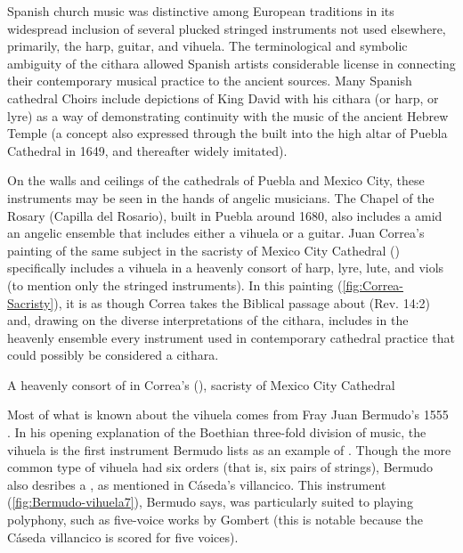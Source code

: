 Spanish church music was distinctive among European traditions in its
widespread inclusion of several plucked stringed instruments not used
elsewhere, primarily, the harp, guitar, and vihuela. 
The terminological and symbolic ambiguity of the cithara allowed Spanish
artists considerable license in connecting their contemporary musical practice
to the ancient sources.
Many Spanish cathedral Choirs include depictions of King David with his cithara
(or harp, or lyre) as a way of demonstrating continuity with the music of the
ancient Hebrew Temple (a concept also expressed through the  built into the high altar of Puebla Cathedral in 1649, and thereafter
widely imitated). 

On the walls and ceilings of the cathedrals of Puebla and Mexico City, these
instruments may be seen in the hands of angelic musicians.
The Chapel of the Rosary (Capilla del Rosario), built in Puebla around 1680,
also includes a  amid an angelic ensemble
that includes either a vihuela or a guitar.
Juan Correa's painting of the same subject in the sacristy of Mexico City
Cathedral () specifically includes a vihuela in a heavenly consort of
harp, lyre, lute, and viols (to mention only the stringed instruments).
In this painting (\cref{fig:Correa-Sacristy}), it is as though Correa takes the
Biblical passage about 
(Rev. 14:2) and, drawing on the diverse interpretations of the cithara, includes
in the heavenly ensemble every instrument used in contemporary cathedral
practice that could possibly be considered a cithara.

{A heavenly consort of  in Correa's  (), sacristy of Mexico City Cathedral}

Most of what is known about the vihuela comes from Fray Juan Bermudo's 1555
.
    \Autocite{Bermudo:Declaracion}
In his opening explanation of the Boethian three-fold division of music, the
vihuela is the first instrument Bermudo lists as an example of
 .
Though the more common type of vihuela had six orders (that is, six pairs of
strings), Bermudo also desribes a , as
mentioned in Cáseda's villancico.%
    \Autocite[90v--110r]{Bermudo:Declaracion}
This instrument (\cref{fig:Bermudo-vihuela7}), Bermudo says, was particularly
suited to playing polyphony, such as five-voice works by Gombert (this is
notable because the Cáseda villancico is scored for five voices).

